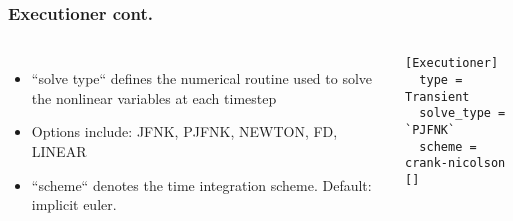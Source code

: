 	\begin{frame}[fragile]
		\frametitle{Executioner cont.}
		\begin{columns}
			\begin{itemize}
				\item ``solve type`` defines the numerical routine used to solve the nonlinear variables at each timestep
				\item Options include: JFNK, PJFNK, NEWTON, FD, LINEAR
				\item ``scheme`` denotes the time integration scheme. Default: implicit euler. 
			\end{itemize}
			\begin{Verbatim}[fontsize=\small]
[Executioner]
  type = Transient
  solve_type = `PJFNK`
  scheme = crank-nicolson
[]
			\end{Verbatim}
		\end{columns}
	\end{frame}